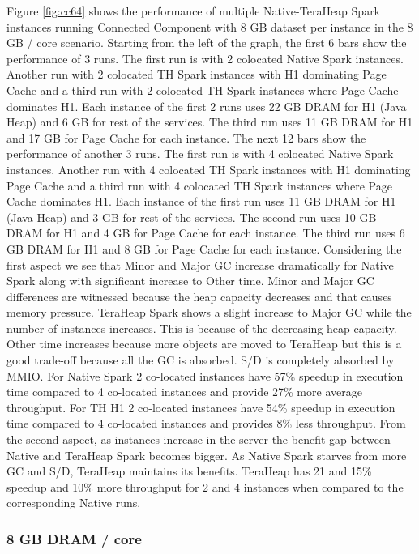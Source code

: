 Figure \ref{fig:cc64} shows the performance of multiple
Native-TeraHeap Spark instances running Connected Component with 8 GB
dataset per instance in the 8 GB / core scenario.
Starting from the left of the graph, the first 6 bars show the
performance of 3 runs. The first run is with 2 colocated Native Spark instances.
Another run with 2 colocated TH Spark instances with H1 dominating Page Cache
and a third run with 2 colocated TH Spark instances where Page Cache dominates H1.
Each instance of the first 2 runs uses 22 GB DRAM for H1 (Java Heap) and 6 GB for rest of the services.
The third run uses 11 GB DRAM for H1 and 17 GB for Page Cache for each instance. 
The next 12 bars show the performance of another 3 runs. The first run is with 4 colocated Native Spark instances.
Another run with 4 colocated TH Spark instances with H1 dominating Page Cache
and a third run with 4 colocated TH Spark instances where Page Cache dominates H1.
Each instance of the first run uses 11 GB DRAM for H1 (Java Heap) and 3 GB for rest of the services.
The second run uses 10 GB DRAM for H1 and 4 GB for Page Cache for each instance.
The third run uses 6 GB DRAM for H1 and 8 GB for Page Cache for each instance.
Considering the first aspect we see that Minor and Major GC increase dramatically for Native Spark along with significant increase to Other time. Minor and Major GC differences are witnessed because the heap capacity decreases and that causes memory pressure. TeraHeap Spark shows a slight increase to Major GC while the number of instances increases. This is because of the decreasing heap capacity. Other time increases because more objects are moved to TeraHeap but this is a good trade-off because all the GC is absorbed. S/D is completely absorbed by MMIO. For Native Spark 2 co-located instances have 57\% speedup in execution time compared to 4 co-located instances and provide 27\% more average throughput. For TH H1 2 co-located instances have 54\% speedup in execution time compared to 4 co-located instances and provides 8\% less throughput.
From the second aspect, as instances increase in the server the benefit gap between Native and TeraHeap Spark becomes bigger. As Native Spark starves from more GC and S/D, TeraHeap maintains its benefits. TeraHeap has 21 and 15\% speedup and 10\% more throughput for 2 and 4 instances when compared to the corresponding Native runs.

\subsubsection{8 GB DRAM / core}

